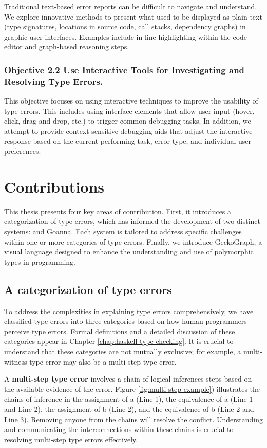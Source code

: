 Traditional text-based error reports can be difficult to navigate and understand. We explore innovative methods to present what used to be displayed as plain text (type signatures, locations in source code, call stacks, dependency graphs) in graphic user interfaces. Examples include in-line highlighting within the code editor and graph-based reasoning steps.  

\subsubsection*{Objective 2.2 Use Interactive Tools for Investigating and Resolving Type Errors.}

This objective focuses on using interactive techniques to improve the usability of type errors.  This includes using interface elements that allow user input (hover, click, drag and drop, etc.) to trigger common debugging tasks. In addition, we attempt to provide context-sensitive debugging aids that adjust the interactive response based on the current performing task, error type, and individual user preferences.


\section{Contributions}

This thesis presents four key areas of contribution. First, it introduces a categorization of type errors, which has informed the development of two distinct systems: \chameleon{} and Goanna. Each system is tailored to address specific challenges within one or more categories of type errors. Finally, we introduce GeckoGraph, a visual language designed to enhance the understanding and use of polymorphic types in programming.

\subsection*{A categorization of type errors}

To address the complexities in explaining type errors comprehensively, we have classified type errors into three categories based on how human programmers perceive type errors. Formal definitions and a detailed discussion of these categories appear in Chapter \ref{chap:haskell-type-checking}. It is crucial to understand that these categories are not mutually exclusive; for example, a multi-witness type error may also be a multi-step type error.

A \textbf{multi-step type error} involves a chain of logical inferences steps based on the available evidence of the error. Figure \ref{fig:multi-step-example}) illustrates the chains of inference in the assignment of a (Line 1), the equivalence of a (Line 1 and Line 2), the assignment of b (Line 2), and the equivalence of b (Line 2 and Line 3). Removing anyone from the chains will resolve the conflict. Understanding and communicating the interconnections within these chains is crucial to resolving multi-step type errors effectively.

